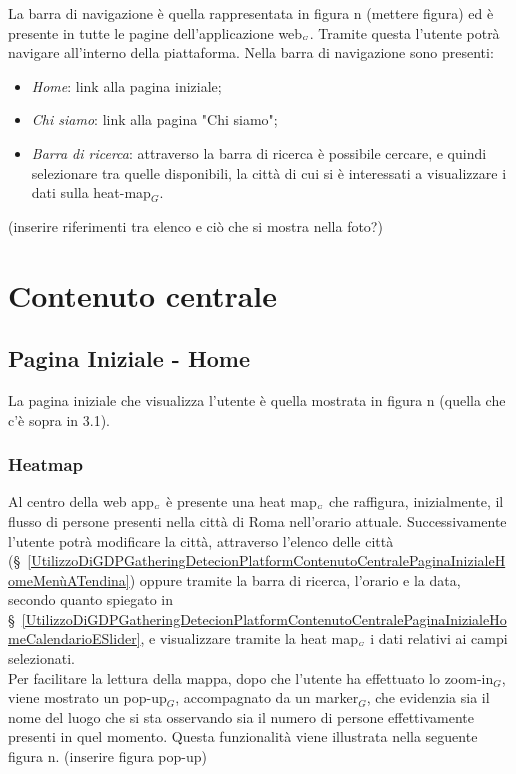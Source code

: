 La barra di navigazione è quella rappresentata in figura n (mettere figura) ed è presente in tutte le pagine dell'applicazione web$_{\scaleto{G}{3pt}}$. Tramite questa l'utente potrà navigare all'interno della piattaforma. Nella barra di navigazione sono presenti:
\begin{itemize}
	\item \textit{Home}: link alla pagina iniziale;
	\item \textit{Chi siamo}: link alla pagina "Chi siamo";
	\item \textit{Barra di ricerca}: attraverso la barra di ricerca è possibile cercare, e quindi selezionare tra quelle disponibili, la città di cui si è interessati a visualizzare i dati sulla heat-map$_G$. 
\end{itemize}
(inserire riferimenti tra elenco e ciò che si mostra nella foto?)

\section{Contenuto centrale}\label{UtilizzoDiGDPGatheringDetecionPlatformContenutoCentrale}
\subsection{Pagina Iniziale - Home} \label{UtilizzoDiGDPGatheringDetecionPlatformContenutoCentralePaginaInizialeHome}
La pagina iniziale che visualizza l'utente è quella mostrata in figura n (quella che c'è sopra in 3.1). 
\subsubsection{Heatmap}\label{UtilizzoDiGDPGatheringDetecionPlatformContenutoCentralePaginaInizialeHomeHeatmap}
Al centro della web app$_{\scaleto{G}{3pt}}$ è presente una heat map$_{\scaleto{G}{3pt}}$ che raffigura, inizialmente, il flusso di persone presenti nella città di Roma nell'orario attuale. Successivamente l'utente potrà modificare la città, attraverso l'elenco delle città (\S~\ref{UtilizzoDiGDPGatheringDetecionPlatformContenutoCentralePaginaInizialeHomeMenùATendina}) oppure tramite la barra di ricerca, l'orario e la data, secondo quanto spiegato in \S~\ref{UtilizzoDiGDPGatheringDetecionPlatformContenutoCentralePaginaInizialeHomeCalendarioESlider}, e visualizzare tramite la heat map$_{\scaleto{G}{3pt}}$ i dati relativi ai campi selezionati.\\
Per facilitare la lettura della mappa, dopo che l'utente ha effettuato lo zoom-in$_G$, viene mostrato un pop-up$_G$, accompagnato da un marker$_G$, che evidenzia sia il nome del luogo che si sta osservando sia il numero di persone effettivamente presenti in quel momento. Questa funzionalità viene illustrata nella seguente figura n. (inserire figura pop-up)
